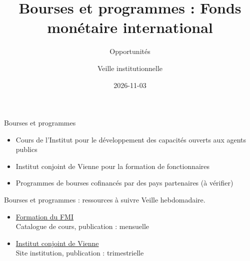 \documentclass[aspectratio=169,11pt]{beamer}
\title{Bourses et programmes : Fonds monétaire international}
\subtitle{Opportunités}
\author{Veille institutionnelle}
\date{2026-11-03}
\begin{document}
\begin{frame}\titlepage\end{frame}

\begin{frame}{Bourses et programmes}
\begin{itemize}
\item Cours de l'Institut pour le développement des capacités ouverts aux agents publics
\item Institut conjoint de Vienne pour la formation de fonctionnaires
\item Programmes de bourses cofinancés par des pays partenaires (à vérifier)
\end{itemize}
\end{frame}

\begin{frame}{Bourses et programmes : ressources à suivre}
\small
Veille hebdomadaire.
\begin{itemize}
\item \href{https://www.imf.org/en/Capacity-Development/training}{Formation du FMI}\\{\footnotesize Catalogue de cours, publication : mensuelle}
\item \href{https://www.jvi.org}{Institut conjoint de Vienne}\\{\footnotesize Site institution, publication : trimestrielle}
\end{itemize}
\end{frame}
\end{document}
